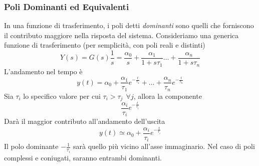 \documentclass[10pt, letterpaper]{report}
\begin{document}
\subsubsection{Poli Dominanti ed Equivalenti}
In una funzione di trasferimento, i poli detti \textit{dominanti} sono quelli che forniscono il 
contributo maggiore nella risposta del sistema. Consideriamo una generica funzione di trasferimento 
(per semplicità, con poli reali e distinti) 
$$ Y(s)=G(s)\frac{1}{s}=\frac{\alpha_0}{s}+\frac{\alpha_1}{1+s\tau_1}\dots +\frac{\alpha_n}{1+s\tau_n}$$
L'andamento nel tempo è 
$$y(t)=\alpha_0+\frac{\alpha_1}{\tau_1}e^{-\frac{t}{\tau_1}}+\dots +\frac{\alpha_n}{\tau_n}e^{-\frac{t}{\tau_n}}$$ 
Sia $\tau_i$ lo specifico valore per cui $\tau_i>\tau_j \ \ \forall j$, allora la componente
$$ \frac{\alpha_i}{\tau_i}e^{-\frac{t}{\tau_i}}$$
Darà il maggior contributo all'andamento dell'uscita 
$$ y(t)\simeq\alpha_0+\frac{\alpha_i}{\tau_i}e^{-\frac{t}{\tau_i}}$$
Il polo dominante $-\frac{1}{\tau_i}$ sarà quello più vicino all'asse immaginario. Nel caso di poli complessi 
e coniugati, saranno entrambi dominanti.
\begin{center}
    \begin{figure}[h!]
        \centering
    \end{figure}
    \end{center}
\end{document}
